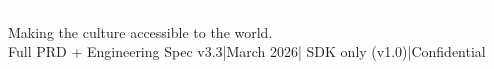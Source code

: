 \documentclass[12pt, a4paper]{article}
\begin{document}
\vspace{2em}
\begin{tcolorbox}[darkbox]
  \centering
  \textcolor{white}{\Large\bfseries DecodedSound}\\[0.5em]
  \textcolor{brandlight}{Making the culture accessible to the world.}\\[0.8em]
  \textcolor{midgray}{\small
    Full PRD + Engineering Spec v3.3\quad|\quad March 2026\quad|\quad
    SDK only (v1.0)\quad|\quad Confidential
  }
\end{tcolorbox}
\end{document}
